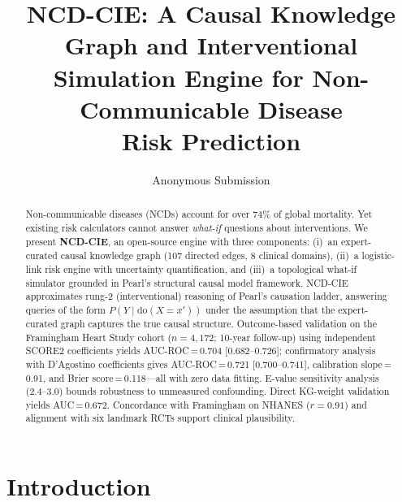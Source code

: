 \documentclass[runningheads]{llncs}
\begin{document}
\title{NCD-CIE: A Causal Knowledge Graph and Interventional\\Simulation Engine for Non-Communicable Disease\\Risk Prediction}

\author{Anonymous Submission}

\maketitle

\begin{abstract}
Non-communicable diseases (NCDs) account for over 74\% of global
mortality.
Yet existing risk calculators cannot answer \emph{what-if} questions
about interventions.
We present \textbf{NCD-CIE}, an open-source engine with three
components:
(i)~an expert-curated causal knowledge graph (107 directed edges,
8 clinical domains),
(ii)~a logistic-link risk engine with uncertainty quantification, and
(iii)~a topological what-if simulator grounded in Pearl's structural
causal model framework.
NCD-CIE approximates rung-2 (interventional) reasoning of Pearl's
causation ladder, answering queries of the form
$P(Y \mid \mathrm{do}(X\!=\!x'))$ under the assumption that the
expert-curated graph captures the true causal structure.
Outcome-based validation on the Framingham Heart Study cohort
($n\!=\!4{,}172$; 10-year follow-up) using independent SCORE2
coefficients yields AUC-ROC\,=\,0.704 [0.682--0.726]; confirmatory
analysis with D'Agostino coefficients gives
AUC-ROC\,=\,0.721 [0.700--0.741],
calibration slope\,=\,0.91, and Brier score\,=\,0.118---all with
zero data fitting.
E-value sensitivity analysis (2.4--3.0) bounds robustness to
unmeasured confounding.
Direct KG-weight validation yields AUC\,=\,0.672.
Concordance with Framingham on NHANES ($r\!=\!0.91$) and alignment
with six landmark RCTs support clinical plausibility.

\end{abstract}

\section{Introduction}\label{sec:intro}
\end{document}
